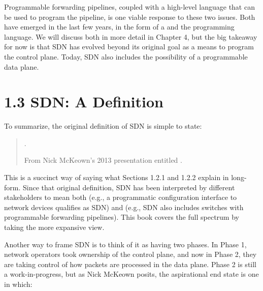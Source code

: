 \documentclass[letterpaper,11pt,english]{sphinxmanual}
\begin{document}
Programmable forwarding pipelines, coupled with a high-level language
that can be used to program the pipeline, is one viable response to
these two issues. Both have emerged in the last few years, in the form
of a  and the 
programming language. We will discuss both in more detail in Chapter
4, but the big takeaway for now is that SDN has evolved beyond its
original goal as a means to program the control plane. Today, SDN also
includes the possibility of a programmable data plane.


\section{1.3 SDN: A Definition}
\label{\detokenize{intro:sdn-a-definition}}
To summarize, the original definition of SDN is simple to state:
\begin{quote}

. %
\begin{footnote}[4]\sphinxAtStartFootnote
From Nick McKeown’s 2013 presentation entitled .
%
\end{footnote}
\end{quote}

This is a succinct way of saying what Sections 1.2.1 and 1.2.2 explain
in long-form. Since that original definition, SDN has been interpreted
by different stakeholders to mean both  (e.g., a programmatic
configuration interface to network devices qualifies as SDN) and
 (e.g., SDN also includes switches with programmable forwarding
pipelines). This book covers the full spectrum by taking the more
expansive view.

Another way to frame SDN is to think of it as having two phases. In
Phase 1, network operators took ownership of the control plane, and
now in Phase 2, they are taking control of how packets are processed
in the data plane. Phase 2 is still a work-in-progress, but as Nick
McKeown posits, the aspirational end state is one in which:
\begin{quote}

\end{quote}
\end{document}
